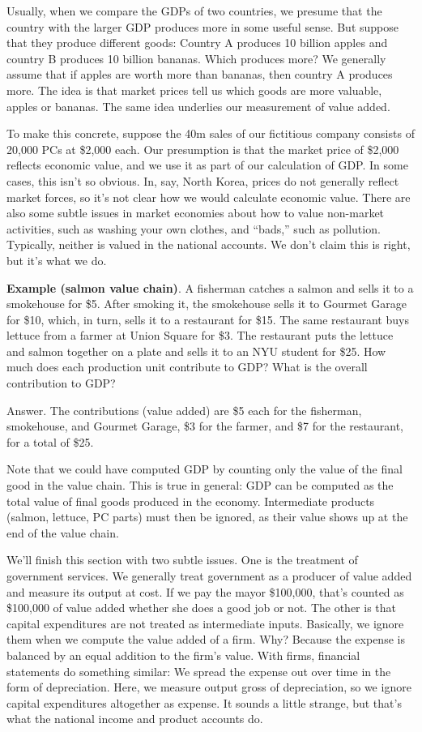 Usually, when we compare the GDPs of two countries, we presume
that the country with the larger GDP produces more in some
useful sense. But suppose that they produce different goods:
Country A produces 10 billion apples and country B produces 10
billion bananas.  Which produces more? We generally assume that if
apples are worth more than bananas, then country A produces more.
The idea is that market prices tell us which goods are more valuable,
apples or bananas. The same idea underlies our measurement of
value added.

To make this concrete, suppose the 40m sales of
our fictitious company consists of 20,000 PCs at \$2,000 each. Our
presumption is that the market price of \$2,000 reflects economic
value, and we use it as part of our calculation of GDP. In some
cases, this isn't so obvious. In, say, North Korea, prices do not
generally reflect market forces, so it's not clear how we would calculate
economic value.
There are also some subtle issues in market economies
about how to value non-market activities, such as
washing your own clothes, and ``bads,'' such as pollution.
Typically, neither is valued in the national accounts.
We don't claim this is right, but it's what we do.

\textbf{Example (salmon value chain)}. A fisherman catches a salmon
and sells it to a smokehouse for \$5. After smoking it, the
smokehouse sells it to Gourmet Garage for \$10, which, in turn,
sells it to a restaurant for \$15. The same restaurant buys
lettuce from a farmer at Union Square for \$3. The restaurant puts
the lettuce and salmon together on a plate and sells it to an NYU
student for \$25. How much does each production unit contribute to
GDP? What is the overall contribution to GDP?

Answer. The contributions (value added) are \$5 each for the
fisherman, smokehouse, and Gourmet Garage, \$3 for the farmer, and
\$7 for the restaurant, for a total of \$25.

Note that we could
have computed GDP by counting only the value of the final good
in the value chain. This is true in general: GDP can be
computed as the total value of final goods produced in the
economy. Intermediate products (salmon, lettuce, PC parts) must
then be ignored, as their value shows up at the end of the value
chain.

We'll finish this section with two subtle issues.
One is the treatment of government services.
We generally treat government as a producer of value added
and measure its output at cost.
If we pay the mayor \$100,000, that's counted as \$100,000
of value added whether she does a good job or not.
The other is that capital expenditures are not treated as
intermediate inputs.
Basically, we ignore them when we compute the value added of a firm.
Why? Because the expense is balanced
by an equal addition to the firm's value.
With firms, financial statements do something similar:
We spread the expense out over time in the form of depreciation.
Here, we measure output gross of depreciation, so we ignore
capital expenditures altogether as expense.
It sounds a little strange, but that's what the national income
and product accounts do.


